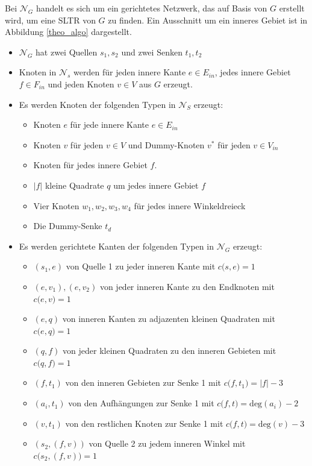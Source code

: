 \begin{network}[SLTR]
Bei $\mathcal{N}_G$ handelt es sich um ein gerichtetes Netzwerk, das auf Basis von $G$ erstellt wird, um eine SLTR von $G$ zu finden. Ein Ausschnitt um ein inneres Gebiet ist in Abbildung \ref{theo_algo} dargestellt.
	\begin{itemize}
	\item $\mathcal{N}_G$ hat zwei Quellen $s_1,s_2$ und zwei Senken $t_1,t_2$
	\item Knoten in $\mathcal{N}_s$ werden für jeden innere Kante $e \in E_{in}$, jedes innere Gebiet $f\in F_{in}$ und jeden Knoten $v \in V$ aus $G$ erzeugt.
	\item Es werden Knoten der folgenden Typen in $\mathcal{N}_S$ erzeugt:
		\begin{itemize}
		\item Knoten $e$ für jede innere Kante $e \in E_{in}$
		\item Knoten $v$ für jeden $v \in V$ und Dummy-Knoten $v^*$ für jeden $v \in V_{in}$
		\item Knoten für jedes innere Gebiet $f$.
		\item $|f|$ kleine Quadrate $q$ um jedes innere Gebiet $f$
		\item Vier Knoten $w_1,w_2,w_3,w_4$ für jedes innere Winkeldreieck
		\item Die Dummy-Senke $t_d$
		\end{itemize}
	\item Es werden gerichtete Kanten der folgenden Typen in $\mathcal{N}_G$ erzeugt:
		\begin{itemize}
		\item $(s_1,e)$ von Quelle 1 zu jeder inneren Kante mit $c\big(s,e\big) = 1$
		\item $(e,v_1),(e,v_2)$ von jeder inneren Kante zu den Endknoten mit $c\big(e,v\big) = 1$
		\item $(e,q)$ von inneren Kanten zu adjazenten kleinen Quadraten mit $c\big(e,q\big) = 1$
		\item $(q,f)$ von jeder kleinen Quadraten zu den inneren Gebieten mit $c\big(q,f\big) = 1$
		\item $(f,t_1)$ von den inneren Gebieten zur Senke 1 mit $c\big(f,t_1\big) = |f|-3$
		\item $(a_i,t_1)$ von den Aufhängungen zur Senke 1 mit $c\big(f,t\big) = \text{deg}(a_i)-2$
		\item $(v,t_1)$ von den restlichen Knoten zur Senke 1 mit $c\big(f,t\big) = \text{deg}(v)-3$		
		\item $(s_2,(f,v))$ von Quelle 2 zu jedem inneren Winkel mit $c\big(s_2,(f,v)\big) = 1$

\end{itemize}
\end{itemize}
\end{network}
